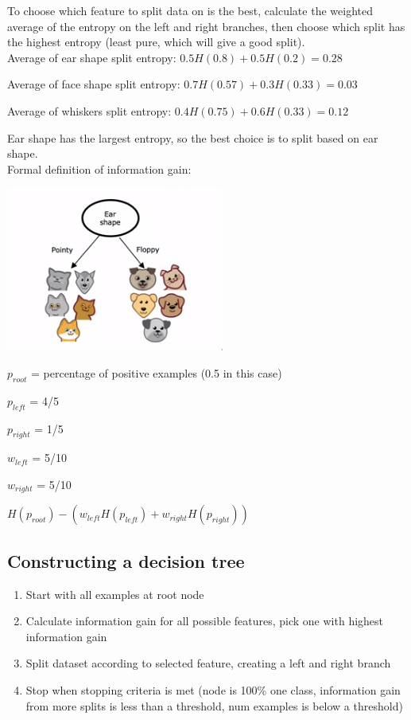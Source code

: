 \documentclass[12pt]{article}
\begin{document}
To choose which feature to split data on is the best, calculate the weighted average of the entropy on the left
and right branches, then choose which split has the highest entropy (least pure, which will give a good split).\\

Average of ear shape split entropy: $0.5 H(0.8) + 0.5 H(0.2) = 0.28$

Average of face shape split entropy: $0.7 H(0.57) + 0.3 H(0.33) = 0.03$

Average of whiskers split entropy: $0.4 H(0.75) + 0.6 H(0.33) = 0.12$

Ear shape has the largest entropy, so the best choice is to split based on ear shape.\\

Formal definition of information gain:

\includegraphics{information-gain}

$p_{root}$ = percentage of positive examples (0.5 in this case)

$p_{left}$ = 4/5

$p_{right}$ = 1/5

$w_{left}$ = 5/10

$w_{right}$ = 5/10

$H(p_{root}) - (w_{left} H(p_{left}) + w_{right} H(p_{right}))$

\subsection{Constructing a decision tree}

\begin{enumerate}
    \item Start with all examples at root node
    \item Calculate information gain for all possible features, pick one with highest information gain
    \item Split dataset according to selected feature, creating a left and right branch
    \item Stop when stopping criteria is met (node is 100\% one class, information gain
        from more splits is less than a threshold, num examples is below a threshold)
\end{enumerate}
\end{document}
